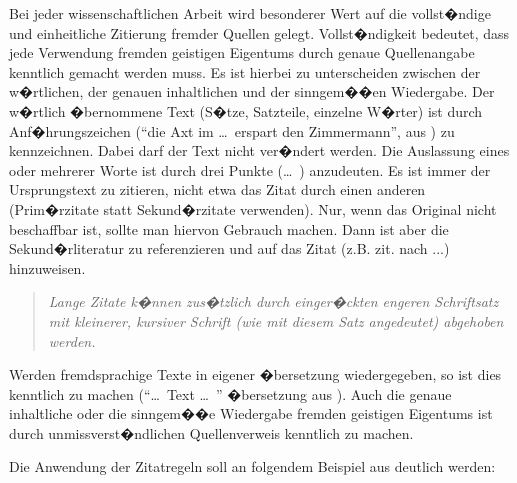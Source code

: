 Bei jeder wissenschaftlichen Arbeit wird besonderer Wert auf die vollst�ndige und einheitliche Zitierung fremder Quellen gelegt. Vollst�ndigkeit bedeutet, dass jede Verwendung fremden geistigen Eigentums durch genaue Quellenangabe kenntlich gemacht werden muss. Es ist hierbei zu unterscheiden
zwischen der w�rtlichen, der genauen inhaltlichen und der sinngem��en Wiedergabe. Der w�rtlich �bernommene Text (S�tze, Satzteile, einzelne W�rter) ist durch Anf�hrungszeichen ("`die Axt im \ldots\  erspart den Zimmermann"', aus \cite{Schiller:Tell}) zu kennzeichnen. Dabei darf der Text nicht
ver�ndert werden. Die Auslassung eines oder mehrerer Worte ist durch drei Punkte (\ldots\ ) anzudeuten. Es ist immer der Ursprungstext zu zitieren, nicht etwa das Zitat durch einen anderen (Prim�rzitate statt Sekund�rzitate verwenden). Nur, wenn das Original nicht beschaffbar ist, sollte man hiervon Gebrauch machen. Dann ist aber die Sekund�rliteratur zu referenzieren und auf das Zitat (z.B. zit. nach ...) hinzuweisen.

\begin{quote}\rmfamily\small\itshape
Lange Zitate k�nnen zus�tzlich durch einger�ckten engeren Schriftsatz mit kleinerer, kursiver Schrift (wie mit diesem Satz angedeutet) abgehoben werden.\end{quote}

Werden fremdsprachige Texte in eigener �bersetzung wiedergegeben, so ist dies kenntlich zu machen
("`\ldots\  Text \ldots\ "' �bersetzung aus \cite{Akaike1974a}). Auch die genaue inhaltliche oder die sinngem��e Wiedergabe fremden geistigen Eigentums ist durch unmissverst�ndlichen Quellenverweis kenntlich zu machen.

Die Anwendung der Zitatregeln soll an folgendem Beispiel aus \cite{web_pruschmann} deutlich werden:

